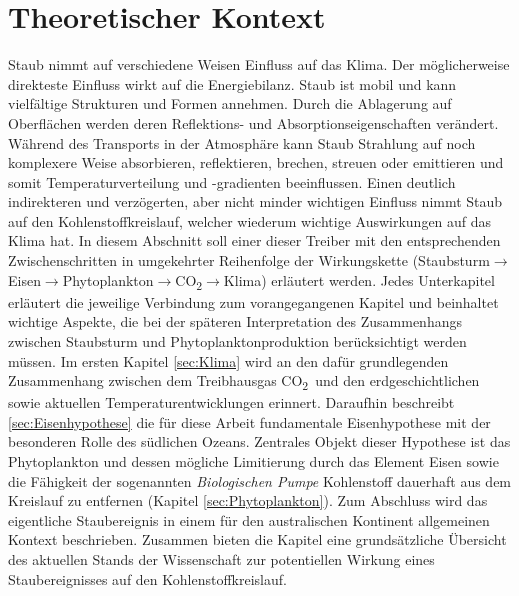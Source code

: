 \documentclass[12pt,a4paper,onecolumn]{scrartcl}
\newcommand{\cotwo}{CO\textsubscript{2}}
\begin{document}
\section{Theoretischer Kontext} \label{sec:Theorie}
Staub nimmt auf verschiedene Weisen Einfluss auf das Klima. Der möglicherweise direkteste Einfluss wirkt auf die Energiebilanz. Staub ist mobil und kann vielfältige Strukturen und Formen annehmen. Durch die Ablagerung auf Oberflächen werden deren Reflektions- und Absorptionseigenschaften verändert. Während des Transports in der Atmosphäre kann Staub Strahlung auf noch komplexere Weise absorbieren, reflektieren, brechen, streuen oder emittieren \citep{Shao.2011} und somit Temperaturverteilung und -gradienten beeinflussen. Einen deutlich indirekteren und verzögerten, aber nicht minder wichtigen Einfluss nimmt Staub auf den Kohlenstoffkreislauf, welcher wiederum wichtige Auswirkungen auf das Klima hat. In diesem Abschnitt soll einer dieser Treiber mit den entsprechenden Zwischenschritten in umgekehrter Reihenfolge der Wirkungskette (Staubsturm$\rightarrow$Eisen$\rightarrow$Phytoplankton$\rightarrow$\cotwo $\rightarrow$Klima) erläutert werden. Jedes Unterkapitel erläutert die jeweilige Verbindung zum vorangegangenen Kapitel und beinhaltet wichtige Aspekte, die bei der späteren Interpretation des Zusammenhangs zwischen Staubsturm und Phytoplanktonproduktion berücksichtigt werden müssen. Im ersten Kapitel \ref{sec:Klima} wird an den dafür grundlegenden Zusammenhang zwischen dem Treibhausgas \cotwo \ und den erdgeschichtlichen sowie aktuellen Temperaturentwicklungen erinnert. Daraufhin beschreibt \ref{sec:Eisenhypothese} die für diese Arbeit fundamentale Eisenhypothese mit der besonderen Rolle des südlichen Ozeans. Zentrales Objekt dieser Hypothese ist das Phytoplankton und dessen mögliche Limitierung durch das Element Eisen sowie die Fähigkeit der sogenannten \textit{Biologischen Pumpe} Kohlenstoff dauerhaft aus dem Kreislauf zu entfernen (Kapitel \ref{sec:Phytoplankton}). Zum Abschluss wird das eigentliche Staubereignis in einem für den australischen Kontinent allgemeinen Kontext beschrieben. Zusammen bieten die Kapitel eine grundsätzliche Übersicht des aktuellen Stands der Wissenschaft zur potentiellen Wirkung eines Staubereignisses auf den Kohlenstoffkreislauf.
\end{document}
